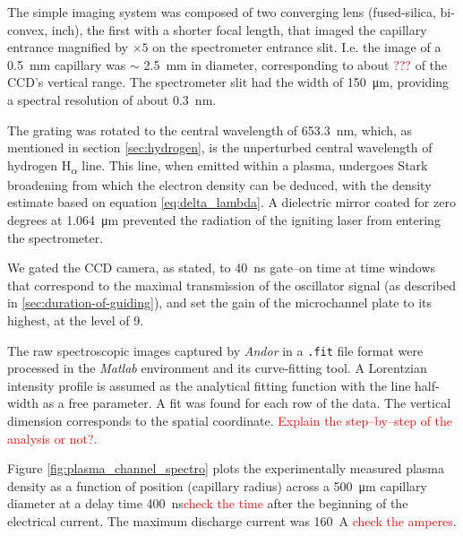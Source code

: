 \documentclass[justified,nofonts,nobib]{tufte-book}
\begin{document}
The simple imaging system was composed of two converging lens (fused-silica, bi-convex,  inch), the first with a shorter focal length, that imaged the capillary entrance magnified by $\times 5$ on the spectrometer entrance slit. I.e. the image of a \SI{0.5}{\mm} capillary was $\sim$ \SI{2.5}{\mm} in diameter, corresponding to about \textcolor{red}{???} of the CCD's vertical range. The spectrometer slit had the width of \SI{150}{\micro\metre}, providing a spectral resolution of about \SI{0.3}{\nm}.

The grating was rotated to the central wavelength of \SI{653.3}{\nm}, which, as mentioned in section \ref{sec:hydrogen}, is the unperturbed central wavelength of hydrogen H\textsubscript{$\alpha$} line. This line, when emitted within a plasma, undergoes Stark broadening from which the electron density can be deduced, with the density estimate based on equation \ref{eq:delta_lambda}. A dielectric mirror coated for zero degrees at \SI{1.064}{\um} prevented the radiation of the igniting laser from entering the spectrometer.

We gated the CCD camera, as stated, to \SI{40}{\ns} gate--on time at time windows that correspond to the maximal transmission of the oscillator signal (as described in \ref{sec:duration-of-guiding}), and set the gain of the microchannel plate to its highest, at the level of 9.

The raw spectroscopic images captured by \textit{Andor} in a \texttt{.fit} file format were processed in the \textit{Matlab} environment and its curve-fitting tool. A Lorentzian intensity profile is assumed as the analytical fitting function with the line half-width as a free parameter. A fit was found for each row of the data. The vertical dimension corresponds to the spatial coordinate. \textcolor{red}{Explain the step--by--step of the analysis or not?.}

Figure \ref{fig:plasma_channel_spectro} plots the experimentally measured plasma density as a function of position (capillary radius) across a \SI{500}{\um} capillary diameter at a delay time \SI{400}{\ns}\textcolor{red}{check the time} after the beginning of the electrical current. The maximum discharge current was \SI{160}{\A} \textcolor{red}{check the amperes}.
\end{document}
